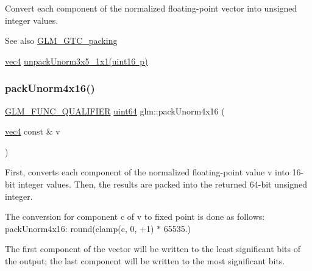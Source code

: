 Convert each component of the normalized floating-\/point vector into unsigned integer values.

\begin{DoxySeeAlso}{See also}
\mbox{\hyperlink{group__gtc__packing}{G\+L\+M\+\_\+\+G\+T\+C\+\_\+packing}} 

\mbox{\hyperlink{group__core__types_ga5881b1b022d7fd1b7218f5916532dd02}{vec4}} \mbox{\hyperlink{group__gtc__packing_gaab3b476e8f320670717fd518f350ce28}{unpack\+Unorm3x5\+\_\+1x1(uint16 p)}} 
\end{DoxySeeAlso}
\mbox{\label{group__gtc__packing_gac561f06c908b7302537a8ef29fcb409e}} 
\subsubsection{\texorpdfstring{pack\+Unorm4x16()}{packUnorm4x16()}}
{\footnotesize\ttfamily \mbox{\hyperlink{setup_8hpp_a33fdea6f91c5f834105f7415e2a64407}{G\+L\+M\+\_\+\+F\+U\+N\+C\+\_\+\+Q\+U\+A\+L\+I\+F\+I\+ER}} \mbox{\hyperlink{group__gtc__type__precision_gae3632bf9b37da66233d78930dd06378a}{uint64}} glm\+::pack\+Unorm4x16 (\begin{DoxyParamCaption}\item[{\mbox{\hyperlink{group__core__types_ga5881b1b022d7fd1b7218f5916532dd02}{vec4}} const \&}]{v }\end{DoxyParamCaption})}

First, converts each component of the normalized floating-\/point value v into 16-\/bit integer values. Then, the results are packed into the returned 64-\/bit unsigned integer.

The conversion for component c of v to fixed point is done as follows\+: pack\+Unorm4x16\+: round(clamp(c, 0, +1) $\ast$ 65535.)

The first component of the vector will be written to the least significant bits of the output; the last component will be written to the most significant bits.

